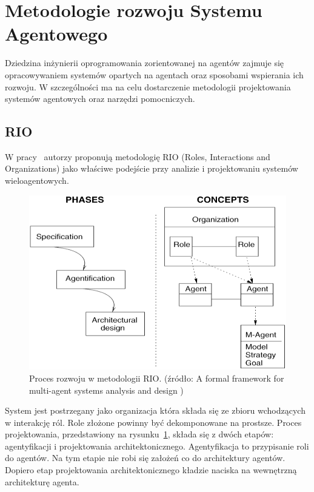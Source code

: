 \documentclass[11pt]{report}
\begin{document}
    \section{Metodologie rozwoju Systemu Agentowego}
    Dziedzina inżynierii oprogramowania zorientowanej na agentów zajmuje się opracowywaniem systemów opartych na agentach oraz sposobami wspierania ich rozwoju.
    W szczególności ma na celu dostarczenie metodologii projektowania systemów agentowych oraz narzędzi pomocniczych.

    \subsection{RIO}
    W pracy~\cite{S095741740200070220020101} autorzy proponują metodologię RIO (Roles, Interactions and Organizations) jako właściwe podejście przy analizie i projektowaniu systemów wieloagentowych.
    \begin{figure}[!ht]
        \centering
        \includegraphics[width=\linewidth]{fig/RIO approach.png}
        \caption{Proces rozwoju w metodologii RIO. (źródło: A formal framework for multi-agent systems analysis and design \cite{S095741740200070220020101})}
        \label{fig:rio}
    \end{figure}
    System jest postrzegany jako organizacja która składa się ze zbioru wchodzących w interakcję ról.
    Role złożone powinny być dekomponowane na prostsze.
    Proces projektowania, przedstawiony na rysunku~\ref{fig:rio}, składa się z dwóch etapów: agentyfikacji i projektowania architektonicznego.
    Agentyfikacja to przypisanie roli do agentów.
    Na tym etapie nie robi się założeń co do architektury agentów.
    Dopiero etap projektowania architektonicznego kładzie naciska na wewnętrzną architekturę agenta.
\end{document}
